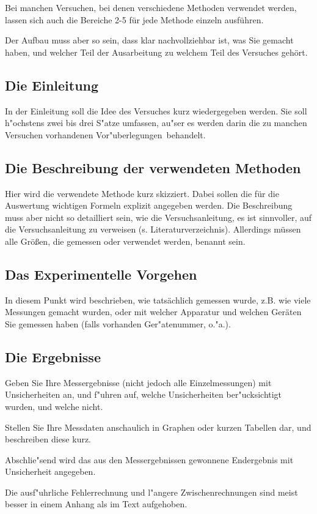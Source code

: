\documentclass[a4paper,11pt]{article}
\begin{document}
Bei manchen Versuchen, bei denen verschiedene Methoden verwendet werden,
lassen sich auch die Bereiche 2-5 für jede Methode einzeln ausführen.

Der Aufbau muss aber so sein, dass klar nachvollziehbar ist, was Sie
gemacht haben, und welcher Teil der Ausarbeitung zu welchem Teil
des Versuches gehört.

\subsection{Die Einleitung}
  In der Einleitung soll die Idee des Versuches kurz wiedergegeben werden.
  Sie soll h"ochstens zwei bis drei S"atze umfassen, au"ser es werden darin 
  die zu manchen Versuchen vorhandenen  \glqq Vor"uberlegungen\grqq\ behandelt.
\subsection{Die Beschreibung der verwendeten Methoden}
  Hier wird die verwendete Methode kurz skizziert. Dabei sollen die für die 
  Auswertung wichtigen Formeln explizit angegeben werden.
  Die Beschreibung muss aber nicht so detailliert sein, wie die Versuchsanleitung,
  es ist sinnvoller, auf die Versuchsanleitung zu verweisen (s. Literaturverzeichnis).
  Allerdings müssen alle Größen, die gemessen oder verwendet werden, benannt sein.
\subsection{Das Experimentelle Vorgehen}
  In diesem Punkt wird beschrieben, wie tatsächlich gemessen wurde, z.B. wie viele
  Messungen gemacht wurden, oder mit welcher Apparatur und welchen Geräten Sie gemessen 
  haben (falls vorhanden Ger"atenummer, o."a.).  
\subsection{Die Ergebnisse}
   Geben Sie Ihre Messergebnisse (nicht jedoch alle Einzelmessungen) mit Unsicherheiten an,
          und f"uhren auf, welche Unsicherheiten ber"ucksichtigt wurden, und welche nicht.

   Stellen Sie Ihre Messdaten anschaulich in Graphen oder kurzen Tabellen dar, 
          und beschreiben diese kurz.

   Abschlie"send wird das aus den Messergebnissen gewonnene Endergebnis mit Unsicherheit angegeben.

   Die ausf"uhrliche Fehlerrechnung und l"angere Zwischenrechnungen sind meist besser in 
          einem Anhang als im Text aufgehoben.
\end{document}
